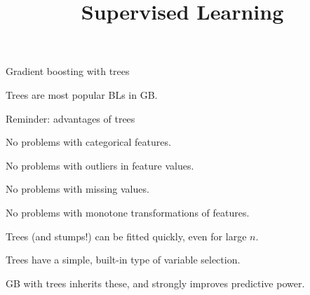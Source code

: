 \documentclass[11pt,compress,t,notes=noshow, xcolor=table]{beamer}
\title{Supervised Learning}
\date{}
\begin{document}


\begin{vbframe}{Gradient boosting with trees}

Trees are most popular BLs in GB.

\begin{blocki}{Reminder: advantages of trees}
\item No problems with categorical features.
\item No problems with outliers in feature values.
\item No problems with missing values.
\item No problems with monotone transformations of features.
\item Trees (and stumps!) can be fitted quickly, even for large $n$.
\item Trees have a simple, built-in type of variable selection.
\end{blocki}
GB with trees inherits these, and strongly improves predictive power.

\end{vbframe}
\end{document}
